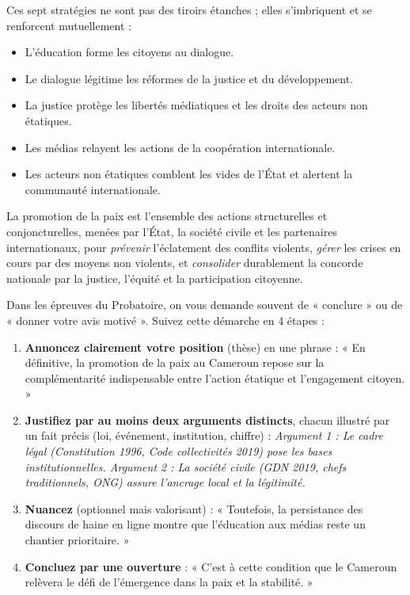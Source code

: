 \documentclass[11pt]{article}
\newcommand{\cle}[1]{{\popxbold\color{popdark}#1}}
\newcounter{popsec}
\newcounter{popsub}
\newcommand{\courssub}[1]{%
  \stepcounter{popsub}%
  \par\vspace{9pt}\noindent{\popxbold\fontsize{11.5}{13}\selectfont\color{popink}{\color{poporange}\thepopsec.\thepopsub}\hspace{6pt}#1}\par\nopagebreak\vspace{4pt}
}
\begin{document}
\courssub{Synthèse : articuler les stratégies}

Ces sept stratégies ne sont pas des tiroirs étanches ; elles s'\cle{imbriquent} et se \cle{renforcent mutuellement} :
\begin{itemize}
    \item L'\cle{éducation} forme les citoyens au dialogue.
    \item Le \cle{dialogue} légitime les réformes de la \cle{justice} et du \cle{développement}.
    \item La \cle{justice} protège les libertés médiatiques et les droits des acteurs non étatiques.
    \item Les \cle{médias} relayent les actions de la coopération internationale.
    \item Les \cle{acteurs non étatiques} comblent les vides de l'État et alertent la communauté internationale.
\end{itemize}

\begin{definition}
La \cle{promotion de la paix} est l'ensemble des actions structurelles et conjoncturelles, menées par l'État, la société civile et les partenaires internationaux, pour \emph{prévenir} l'éclatement des conflits violents, \emph{gérer} les crises en cours par des moyens non violents, et \emph{consolider} durablement la concorde nationale par la justice, l'équité et la participation citoyenne.
\end{definition}

\begin{methode}
Dans les épreuves du Probatoire, on vous demande souvent de « conclure » ou de « donner votre avis motivé ». Suivez cette démarche en 4 étapes :
\begin{enumerate}
    \item \textbf{Annoncez clairement votre position} (thèse) en une phrase : « En définitive, la promotion de la paix au Cameroun repose sur la complémentarité indispensable entre l'action étatique et l'engagement citoyen. »
    \item \textbf{Justifiez par au moins deux arguments distincts}, chacun illustré par un fait précis (loi, événement, institution, chiffre) : \textit{Argument 1 : Le cadre légal (Constitution 1996, Code collectivités 2019) pose les bases institutionnelles. Argument 2 : La société civile (GDN 2019, chefs traditionnels, ONG) assure l'ancrage local et la légitimité.}
    \item \textbf{Nuancez} (optionnel mais valorisant) : « Toutefois, la persistance des discours de haine en ligne montre que l'éducation aux médias reste un chantier prioritaire. »
    \item \textbf{Concluez par une ouverture} : « C'est à cette condition que le Cameroun relèvera le défi de l'émergence dans la paix et la stabilité. »
\end{enumerate}
\end{methode}
\end{document}
